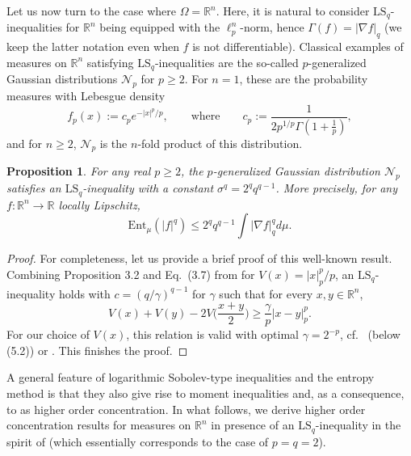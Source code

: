 \documentclass[a4paper,12pt]{amsart}
\numberwithin{equation}{section}
\newtheorem{proposition}[satz]{Proposition}
\theoremstyle{remark}
\def\R{{\mathbb R}}
\begin{document}
Let us now turn to the case where $\Omega=\R^n$. Here, it is natural to consider $\mathrm{LS}_q$-inequalities for $\R^n$ being equipped with the $\ell_p^n$-norm, hence $\Gamma(f) = |\nabla f|_q$ (we keep the latter notation even when $f$ is not differentiable). Classical examples of measures on $\R^n$ satisfying $\mathrm{LS}_q$-inequalities are the so-called $p$-generalized Gaussian distributions $\mathcal{N}_p$ for $p \ge 2$. For $n=1$, these are the probability measures with Lebesgue density
\[
f_p(x) := c_p e^{-|x|^p/p},\qquad \text{where}\qquad c_p := \frac{1}{2p^{1/p}\Gamma(1 + \frac{1}{p})},
\]
and for $n \ge 2$, $\mathcal{N}_p$ is the $n$-fold product of this distribution.

\begin{proposition}\label{LSIp-Gauss}
For any real $p \ge 2$, the $p$-generalized Gaussian distribution $\mathcal{N}_p$ satisfies an $\mathrm{LS}_q$-inequality with a constant $\sigma^q = 2^qq^{q-1}$. More precisely, for any $f \colon \R^n \to \R$ locally Lipschitz,
\[
\mathrm{Ent}_\mu(|f|^q) \le 2^qq^{q-1} \int \lvert \nabla f \rvert_q^q d\mu.
\]
\end{proposition}

\begin{proof}
For completeness, let us provide a brief proof of this well-known result. Combining Proposition 3.2 and Eq.\ (3.7) from \cite{BL00} for $V(x) = |x|_p^p/p$, an $\mathrm{LS}_q$-inequality holds with $c=(q/\gamma)^{q-1}$ for $\gamma$ such that for every $x,y \in \R^n$,
\[
V(x) + V(y) - 2V\Big(\frac{x+y}{2}\Big) \ge \frac{\gamma}{p} |x-y|_p^p.
\]
For our choice of $V(x)$, this relation is valid with optimal $\gamma = 2^{-p}$, cf.\ \cite{BL00} (below (5.2)) or \cite{LT79}. This finishes the proof.
\end{proof}

A general feature of logarithmic Sobolev-type inequalities and the entropy method is that they also give rise to moment inequalities and, as a consequence, to as higher order concentration. In what follows, we derive higher order concentration results for measures on $\R^n$ in presence of an $\mathrm{LS}_q$-inequality in the spirit of \cite[Sect.\ 1.3]{BGS19} (which essentially corresponds to the case of $p=q=2$).
\end{document}
